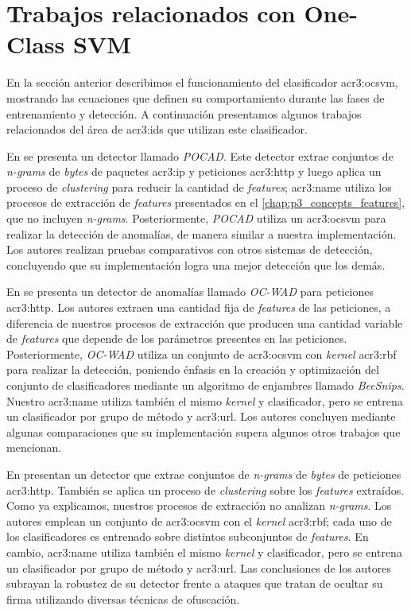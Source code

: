 \section{Trabajos relacionados con One-Class SVM}

En la sección anterior describimos el funcionamiento del clasificador
\gls{acr3:ocsvm}, mostrando las ecuaciones que definen su comportamiento
durante las fases de entrenamiento y detección.
A continuación presentamos algunos trabajos relacionados del área de
\gls{acr3:ids} que utilizan este clasificador.

En \citep{nguyen2016pocad} se presenta un detector llamado \textit{POCAD}.
Este detector extrae conjuntos de \textit{n-grams} de \textit{bytes} de
paquetes \gls{acr3:ip} y peticiones \gls{acr3:http} y luego aplica un
proceso de \textit{clustering} para reducir la cantidad de \textit{features};
\gls{acr3:name} utiliza los procesos de extracción de \textit{features}
presentados en el \autoref{chap:p3_concepts_features}, que no incluyen
\textit{n-grams}.
Posteriormente, \textit{POCAD} utiliza un \gls{acr3:ocsvm} para realizar
la detección de anomalías, de manera similar a nuestra implementación.
Los autores realizan pruebas comparativos con otros sistemas de detección,
concluyendo que su implementación logra una mejor detección que los demás.

En \citep{parhizkar2015oc} se presenta un detector de anomalías llamado
\textit{OC-WAD} para peticiones \gls{acr3:http}. Los autores extraen
una cantidad fija de \textit{features} de las peticiones, a diferencia
de nuestros procesos de extracción que producen una cantidad variable
de \textit{features} que depende de los parámetros presentes en las
peticiones.
Posteriormente, \textit{OC-WAD} utiliza un conjunto de \gls{acr3:ocsvm}
con \textit{kernel} \gls{acr3:rbf} para realizar la detección, poniendo
énfasis en la creación y optimización del conjunto de clasificadores
mediante un algoritmo de enjambres llamado \textit{BeeSnips}.
Nuestro \gls{acr3:name} utiliza también el mismo \textit{kernel} y
clasificador, pero se entrena un clasificador por grupo de método y
\gls{acr3:url}.
Los autores concluyen mediante algunas comparaciones que su implementación
supera algunos otros trabajos que mencionan.

En \citep{perdisci2006using} presentan un detector que extrae conjuntos
de \textit{n-grams} de \textit{bytes} de peticiones \gls{acr3:http}.
También se aplica un proceso de \textit{clustering} sobre los \textit{features}
extraídos. Como ya explicamos, nuestros procesos de extracción no analizan
\textit{n-grams}.
Los autores emplean un conjunto de \gls{acr3:ocsvm} con el \textit{kernel}
\gls{acr3:rbf}; cada uno de los clasificadores es entrenado sobre distintos
subconjuntos de \textit{features}. En cambio, \gls{acr3:name} utiliza
también el mismo \textit{kernel} y clasificador, pero se entrena un
clasificador por grupo de método y \gls{acr3:url}.
Las conclusiones de los autores subrayan la robustez de su detector
frente a ataques que tratan de ocultar su firma utilizando diversas
técnicas de ofuscación.

